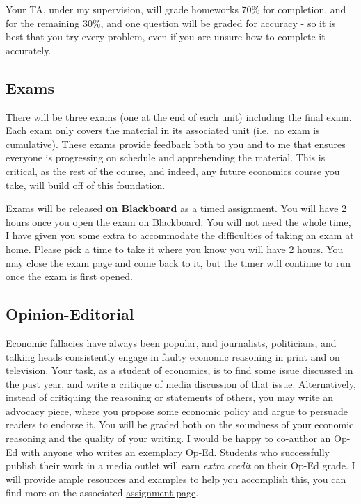 \documentclass{article}
\begin{document}
Your TA, under my supervision, will grade homeworks 70\% for completion,
and for the remaining 30\%, and one question will be graded for accuracy
- so it is best that you try every problem, even if you are unsure how
to complete it accurately.

\hypertarget{exams}{%
\subsection*{Exams}\label{exams}}

There will be three exams (one at the end of each unit) including the
final exam. Each exam only covers the material in its associated unit
(i.e.~no exam is cumulative). These exams provide feedback both to you
and to me that ensures everyone is progressing on schedule and
apprehending the material. This is critical, as the rest of the course,
and indeed, any future economics course you take, will build off of this
foundation.

Exams will be released \textbf{on Blackboard} as a timed assignment. You
will have 2 hours once you open the exam on Blackboard. You will not
need the whole time, I have given you some extra to accommodate the
difficulties of taking an exam at home. Please pick a time to take it
where you know you will have 2 hours. You may close the exam page and
come back to it, but the timer will continue to run once the exam is
first opened.

\hypertarget{opinion-editorial}{%
\subsection*{Opinion-Editorial}\label{opinion-editorial}}

Economic fallacies have always been popular, and journalists,
politicians, and talking heads consistently engage in faulty economic
reasoning in print and on television. Your task, as a student of
economics, is to find some issue discussed in the past year, and write a
critique of media discussion of that issue. Alternatively, instead of
critiquing the reasoning or statements of others, you may write an
advocacy piece, where you propose some economic policy and argue to
persuade readers to endorse it. You will be graded both on the soundness
of your economic reasoning and the quality of your writing. I would be
happy to co-author an Op-Ed with anyone who writes an exemplary Op-Ed.
Students who successfully publish their work in a media outlet will earn
\emph{extra credit} on their Op-Ed grade. I will provide ample resources
and examples to help you accomplish this, you can find more on the
associated \href{assignment/op-ed}{assignment page}.
\end{document}
